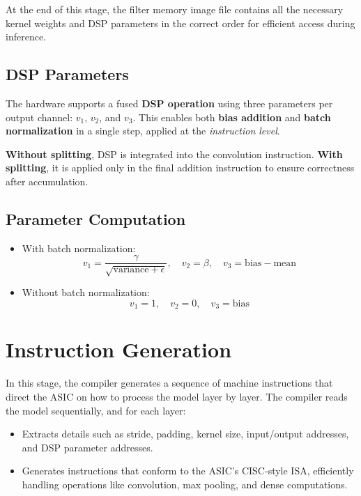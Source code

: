 \documentclass[12pt]{report}
\begin{document}
At the end of this stage, the filter memory image file contains all the necessary kernel weights and DSP parameters in the correct order for efficient access during inference.

\subsection{DSP Parameters}

The hardware supports a fused \textbf{DSP operation} using three parameters per output channel: $v_1$, $v_2$, and $v_3$. This enables both \textbf{bias addition} and \textbf{batch normalization} in a single step, applied at the \textit{instruction level}.

\textbf{Without splitting}, DSP is integrated into the convolution instruction. \textbf{With splitting}, it is applied only in the final addition instruction to ensure correctness after accumulation.

\subsection*{Parameter Computation}
\begin{itemize}
    \item With batch normalization:
    \[
    v_1 = \frac{\gamma}{\sqrt{\text{variance} + \epsilon}}, \quad
    v_2 = \beta, \quad
    v_3 = \text{bias} - \text{mean}
    \]
    \item Without batch normalization:
    \[
    v_1 = 1, \quad
    v_2 = 0, \quad
    v_3 = \text{bias}
    \]
\end{itemize}


\section{Instruction Generation}

In this stage, the compiler generates a sequence of machine instructions that direct the ASIC on how to process the model layer by layer. The compiler reads the model sequentially, and for each layer:
\begin{itemize}
    \item Extracts details such as stride, padding, kernel size, input/output addresses, and DSP parameter addresses.
    \item Generates instructions that conform to the ASIC’s CISC-style ISA, efficiently handling operations like convolution, max pooling, and dense computations.
\end{itemize}
\end{document}
